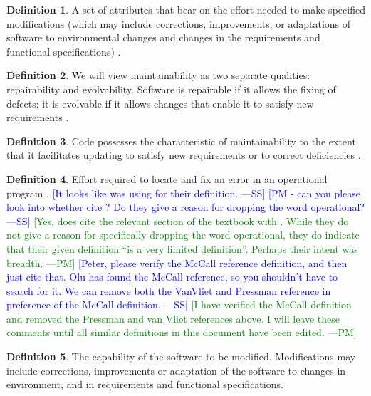 \documentclass[letterpaper,cleveref]{lipics-v2019}
\newcommand{\authornote}[3]{\textcolor{#1}{[#3 ---#2]}}
\newcommand{\authornote}[3]{}
\newcommand{\wss}[1]{\authornote{blue}{SS}{#1}} %
\newcommand{\pmi}[1]{\authornote{green}{PM}{#1}} %
\theoremstyle{definition}
\newtheorem{defn}{Definition}
\begin{document}
\begin{defn}
  A set of attributes that bear on the effort needed to make specified
  modifications (which may include corrections, improvements, or adaptations of
  software to environmental changes and changes in the requirements and
  functional specifications) \citep{pfleeger2006software}.
\end{defn}

\begin{defn}
  We will view maintainability as two separate qualities: repairability and
  evolvability. Software is repairable if it allows the fixing of defects; it is
  evolvable if it allows changes that enable it to satisfy new requirements
  \citep{ghezzi1991fundamentals}.
\end{defn}

\begin{defn} \label{MaintainabilityDefnSelected2} 
  Code possesses the characteristic of maintainability to the extent that it
  facilitates updating to satisfy new requirements or to correct deficiencies
  \citep{boehm2007software}.
\end{defn}

\begin{defn}
  Effort required to locate and fix an error in an operational program
  \citep{McCallEtAl1977}. \wss{It looks
    like \citet{pressman2005software} was using \citet{McCallEtAl1977} for their
    definition.} \wss{PM - can you please look into whether
    \citet{pressman2005software} cite \citet{McCallEtAl1977}?  Do they give a
    reason for dropping the word operational?}  \pmi{Yes,
    \citet{pressman2005software} does cite the relevant section of the textbook
    with \citet{McCallEtAl1977}. While they do not give a reason for
    specifically dropping the word operational, they do indicate that their
    given definition ``is a very limited definition''. Perhaps their intent was
    breadth.} \wss{Peter, please verify the McCall reference definition, and
    then just cite that.  Olu has found the McCall reference, so you shouldn't
    have to search for it.  We can remove both the VanVliet and Pressman
    reference in  preference of the McCall definition.}
\pmi{I have verified the McCall definition and removed the Pressman and van Vliet references above. I will leave these comments until all similar definitions in this document have been edited.}
\end{defn}

\begin{defn}
  The capability of the software to be modified.  Modifications may include
  corrections, improvements or adaptation of the software to changes in
  environment, and in requirements and functional specifications. \cite{ISO9126}
\end{defn}
\end{document}
